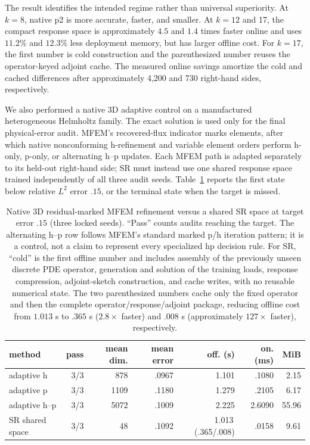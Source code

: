 \documentclass[11pt]{article}
\numberwithin{algorithm}{section}
\theoremstyle{definition}\newtheorem{definition}[theorem]{Definition}
\theoremstyle{remark}\newtheorem{remark}[theorem]{Remark}
\begin{document}
The result identifies the intended regime rather than universal superiority.
At $k=8$, native p2 is more accurate, faster, and smaller.  At $k=12$ and 17,
the compact response space is approximately $4.5$ and $1.4$ times faster
online and uses $11.2\%$ and $12.3\%$ less deployment memory, but has larger
offline cost.  For $k=17$, the first number is cold construction and the
parenthesized number reuses the operator-keyed adjoint cache.  The measured
online savings amortize the cold and cached differences after approximately
4,200 and 730 right-hand sides, respectively.

We also performed a native 3D adaptive control on a
manufactured heterogeneous Helmholtz family.  The exact solution is used only
for the final physical-error audit.  MFEM's recovered-flux indicator marks
elements, after which native nonconforming h-refinement and variable element
orders perform h-only, p-only, or alternating h--p updates.  Each MFEM path is
adapted separately to its held-out right-hand side; SR must instead use one
shared response space trained independently of all three audit seeds.
Table~\ref{tab:helmholtz-3d-adaptive-hp} reports the first state below relative
$L^2$ error $.15$, or the terminal state when the target is missed.

\begin{table}[H]
\centering
\caption{Native 3D residual-marked MFEM refinement versus a
shared SR space at target error $.15$ (three locked seeds).  ``Pass'' counts
audits reaching the target.  The alternating h--p row follows MFEM's standard
marked p/h iteration pattern; it is a control, not a claim to represent every
specialized hp decision rule.  For SR, ``cold'' is the first offline number and
includes assembly of the previously unseen discrete PDE operator, generation
and solution of the training loads, response compression, adjoint-sketch
construction, and cache writes, with no reusable numerical state.  The two
parenthesized numbers cache only the fixed operator and then the complete
operator/response/adjoint package, reducing offline cost from $1.013$ s to
$.365$ s ($2.8\times$ faster) and $.008$ s (approximately $127\times$ faster),
respectively.}
\label{tab:helmholtz-3d-adaptive-hp}
\begin{tabular}{lrrrrrr}
\toprule
method & pass & mean dim. & mean error & off. (s) & on. (ms) & MiB\\
\midrule
adaptive h & 3/3 & 878 & .0967 & 1.101 & .1080 & 2.15\\
adaptive p & 3/3 & 1109 & .1180 & 1.279 & .2105 & 6.17\\
adaptive h--p & 3/3 & 5072 & .1009 & 2.225 & 2.6090 & 55.96\\
SR shared space & 3/3 & 48 & .1092 & 1.013\,(.365/.008) & .0158 & 9.61\\
\bottomrule
\end{tabular}
\end{table}
\end{document}

